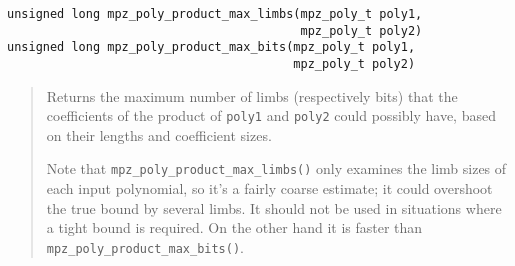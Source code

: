 \documentclass[a4paper,10pt]{article}
\newcommand{\code}{\lstinline}
\begin{document}
\begin{lstlisting}
unsigned long mpz_poly_product_max_limbs(mpz_poly_t poly1,
                                         mpz_poly_t poly2)
unsigned long mpz_poly_product_max_bits(mpz_poly_t poly1,
                                        mpz_poly_t poly2)
\end{lstlisting}
\begin{quote}
Returns the maximum number of limbs (respectively bits) that the coefficients of the product of \code{poly1} and \code{poly2} could possibly have, based on their lengths and coefficient sizes.

Note that \code{mpz_poly_product_max_limbs()} only examines the limb sizes of each input polynomial, so it's a fairly coarse estimate; it could overshoot the true bound by several limbs. It should not be used in situations where a tight bound is required. On the other hand it is faster than \code{mpz_poly_product_max_bits()}.
\end{quote}





\end{document}
